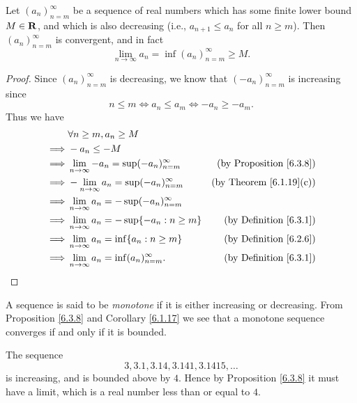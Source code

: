 \begin{additional corollary}\label{ac 6.3.1}
Let \((a_n)_{n = m}^\infty\) be a sequence of real numbers which has some finite lower bound \(M \in \mathbf{R}\), and which is also decreasing (i.e., \(a_{n + 1} \leq a_n\) for all \(n \geq m\)).
Then \((a_n)_{n = m}^\infty\) is convergent, and in fact
\[
    \lim_{n \to \infty} a_n = \inf(a_n)_{n = m}^\infty \geq M.
\]
\end{additional corollary}

\begin{proof}
    Since \((a_n)_{n = m}^\infty\) is decreasing, we know that \((-a_n)_{n = m}^\infty\) is increasing since
    \[
        n \leq m \iff a_n \leq a_m \iff -a_n \geq -a_m.
    \]
    Thus we have
    \begin{align*}
                 & \forall n \geq m, a_n \geq M                                                               \\
        \implies & -a_n \leq -M                                                                               \\
        \implies & \lim_{n \to \infty} -a_n = \sup(-a_n)_{n = m}^\infty & \text{(by Proposition \ref{6.3.8})} \\
        \implies & -\lim_{n \to \infty} a_n = \sup(-a_n)_{n = m}^\infty & \text{(by Theorem \ref{6.1.19}(c))} \\
        \implies & \lim_{n \to \infty} a_n = -\sup(-a_n)_{n = m}^\infty                                       \\
        \implies & \lim_{n \to \infty} a_n = -\sup\{-a_n : n \geq m\}   & \text{(by Definition \ref{6.3.1})}  \\
        \implies & \lim_{n \to \infty} a_n = \inf\{a_n : n \geq m\}     & \text{(by Definition \ref{6.2.6})}  \\
        \implies & \lim_{n \to \infty} a_n = \inf(a_n)_{n = m}^\infty.  & \text{(by Definition \ref{6.3.1})}
    \end{align*}
\end{proof}

\begin{note}
    A sequence is said to be \emph{monotone} if it is either increasing or decreasing.
    From Proposition \ref{6.3.8} and Corollary \ref{6.1.17} we see that a monotone sequence converges if and only if it is bounded.
\end{note}

\begin{example}\label{6.3.9}
    The sequence
    \[
        3, 3.1, 3.14, 3.141, 3.1415, \dots
    \]
    is increasing, and is bounded above by \(4\).
    Hence by Proposition \ref{6.3.8} it must have a limit, which is a real number less than or equal to \(4\).
\end{example}


